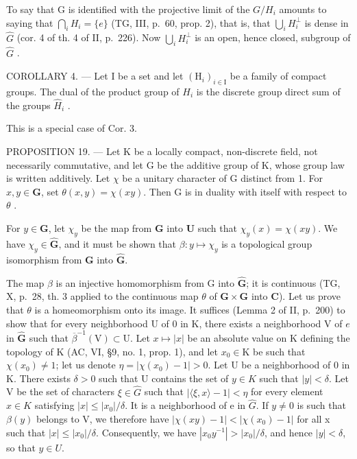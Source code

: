 To say that G is identified with the projective limit of the \(G/H_{i}\) amounts to saying that \(\bigcap_{i}H_{i}=\{e\}\) (TG, III, p.~60, prop. 2), that is, that \(\bigcup_{i}H_{i}^{\perp}\) is dense in \(\widehat{G}\) (cor. 4 of th. 4 of II, p.~226). Now \(\bigcup_{i}H_{i}^{\perp}\) is an open, hence closed, subgroup of \(\widehat{G}\) .

COROLLARY 4. --- Let I be a set and let \((\mathrm{H}_{i})_{i\in\mathrm{I}}\) be a family of compact groups. The dual of the product group of \(H_{i}\) is the discrete group direct sum of the groups \(\widehat{H}_{i}\) .

This is a special case of Cor. 3.

PROPOSITION 19. --- Let K be a locally compact, non-discrete field, not necessarily commutative, and let G be the additive group of K, whose group law is written additively. Let \(\chi\) be a unitary character of G distinct from 1. For \(x,y\in\mathbf{G}\), set \(\theta(x,y)=\chi(xy)\). Then G is in duality with itself with respect to \(\theta\) .

For \(y \in \mathbf{G}\), let \(\chi_y\) be the map from \(\mathbf{G}\) into \(\mathbf{U}\) such that \(\chi_y(x) = \chi(xy)\). We have \(\chi_y \in \widehat{\mathbf{G}}\), and it must be shown that \(\beta: y \mapsto \chi_y\) is a topological group isomorphism from \(\mathbf{G}\) into \(\widehat{\mathbf{G}}\).

The map \(\beta\) is an injective homomorphism from G into \(\widehat{\mathbf{G}}\); it is continuous (TG, X, p.~28, th. 3 applied to the continuous map \(\theta\) of \(\mathbf{G} \times \mathbf{G}\) into \(\mathbf{C}\)). Let us prove that \(\theta\) is a homeomorphism onto its image. It suffices (Lemma 2 of II, p.~200) to show that for every neighborhood U of 0 in K, there exists a neighborhood V of \(e\) in \(\widehat{\mathbf{G}}\) such that \(\overline{\beta}^{-1}(\mathrm{V}) \subset \mathrm{U}\). Let \(x \mapsto |x|\) be an absolute value on K defining the topology of K (AC, VI, §9, no. 1, prop. 1), and let \(x_0 \in \mathrm{K}\) be such that \(\chi(x_{0}) \neq 1\); let us denote \(\eta = |\chi(x_{0}) - 1| > 0\). Let U be a neighborhood of 0 in K. There exists \(\delta > 0\) such that U contains the set of \(y \in K\) such that \(|y| < \delta\). Let V be the set of characters \(\xi \in \widehat{G}\) such that \(|\langle\xi, x\rangle - 1| < \eta\) for every element \(x \in K\) satisfying \(|x| \leqslant |x_{0}|/\delta\). It is a neighborhood of e in \(\widehat{G}\). If \(y \neq 0\) is such that \(\beta(y)\) belongs to V, we therefore have \(|\chi(xy) - 1| < |\chi(x_{0}) - 1|\) for all x such that \(|x| \leqslant |x_{0}|/\delta\). Consequently, we have \(|x_{0}y^{-1}| > |x_{0}|/\delta\), and hence \(|y| < \delta\), so that \(y \in U\).

